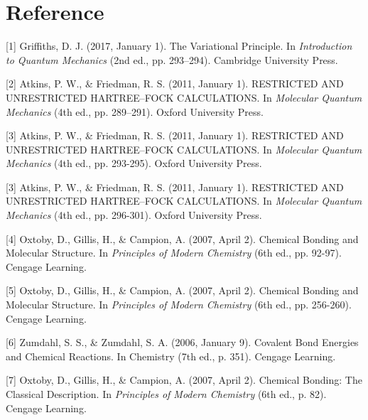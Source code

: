\documentclass[%
 reprint,
 amsmath,amssymb,
 aps,
]{revtex4-2}
\begin{document}
\section{\label{sec:level1}Reference}
[1] Griffiths, D. J. (2017, January 1). The Variational Principle. In \textit{Introduction to Quantum Mechanics} (2nd ed., pp. 293–294). Cambridge University Press.

[2] Atkins, P. W., \& Friedman, R. S. (2011, January 1). RESTRICTED AND UNRESTRICTED HARTREE–FOCK CALCULATIONS. In \textit{Molecular Quantum Mechanics} (4th ed., pp. 289–291). Oxford University Press.

[3] Atkins, P. W., \& Friedman, R. S. (2011, January 1). RESTRICTED AND UNRESTRICTED HARTREE–FOCK CALCULATIONS. In \textit{Molecular Quantum Mechanics} (4th ed., pp. 293-295). Oxford University Press.

[3] Atkins, P. W., \& Friedman, R. S. (2011, January 1). RESTRICTED AND UNRESTRICTED HARTREE–FOCK CALCULATIONS. In \textit{Molecular Quantum Mechanics} (4th ed., pp. 296-301). Oxford University Press.

[4] Oxtoby, D., Gillis, H., \& Campion, A. (2007, April 2). Chemical Bonding and Molecular Structure. In \textit{Principles of Modern Chemistry} (6th ed., pp. 92-97). Cengage Learning.

[5] Oxtoby, D., Gillis, H., \& Campion, A. (2007, April 2). Chemical Bonding and Molecular Structure. In \textit{Principles of Modern Chemistry} (6th ed., pp. 256-260). Cengage Learning.

[6] Zumdahl, S. S., \& Zumdahl, S. A. (2006, January 9). Covalent Bond Energies and Chemical Reactions. In Chemistry (7th ed., p. 351). Cengage Learning.

[7] Oxtoby, D., Gillis, H., \& Campion, A. (2007, April 2). Chemical Bonding: The Classical Description. In \textit{Principles of Modern Chemistry} (6th ed., p. 82). Cengage Learning.
\end{document}
